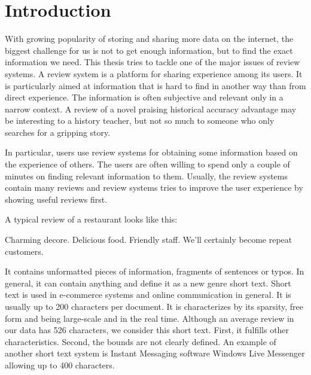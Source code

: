 \chapter*{Introduction}



With growing popularity of storing and sharing more data on the internet, the biggest challenge
for us is not to get enough information, but to find the exact information we need.
This thesis tries to tackle one of the major issues of review systems.
A review system is a platform for sharing experience among its users.
It is particularly aimed at information that is hard to find in another way than from direct experience.
The information is often subjective and relevant only in a narrow context.
A review of a novel praising historical accuracy advantage may be interesting to a history teacher,
but not so much to someone who only searches for a gripping story.

In particular, users use review systems for obtaining some information based on the experience of others.
The users are often willing to spend only a couple of minutes on finding relevant information to them.
Usually, the review systems contain many reviews and review systems tries to improve the user experience by showing useful reviews first.

A typical review of a restaurant looks like this:

\begin{code}
Charming decore. Delicious food. Friendly staff.
We'll certainly become repeat customers.
\end{code}

It contains unformatted pieces of information, fragments of sentences or typos.
In general, it can contain anything and \citet{Song14} define it as a new genre short text.
Short text is used in e-commerce systems and online communication in general.
It is usually up to 200 characters per document.
It is characterizes by its sparsity, free form and being large-scale and in the real time.
Although an average review in our data has 526 characters, we consider this short text.
First, it fulfills other characteristics.
Second, the bounds are not clearly defined.
An example of another short text system is Instant Messaging software Windows Live Messenger allowing up to 400 characters.

